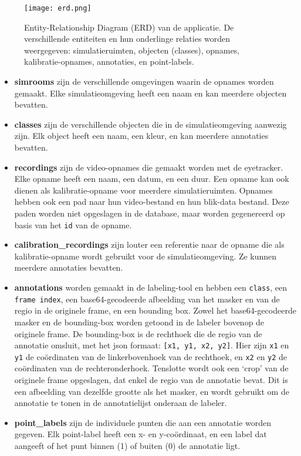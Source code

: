 \begin{figure}[H]
  \centering
  \texttt{[image: erd.png]}
  \caption[]{\label{fig:erd} Entity-Relationship Diagram (ERD) van de applicatie. De verschillende entiteiten en hun onderlinge relaties worden weergegeven: simulatieruimten, objecten (classes), opnames, kalibratie-opnames, annotaties, en point-labels. }
\end{figure}

\begin{itemize}
  \item \textbf{simrooms} zijn de verschillende omgevingen waarin de opnames worden gemaakt. 
  Elke simulatieomgeving heeft een naam en kan meerdere objecten bevatten.
  \item \textbf{classes} zijn de verschillende objecten die in de simulatieomgeving aanwezig zijn. 
  Elk object heeft een naam, een kleur, en kan meerdere annotaties bevatten.
  \item \textbf{recordings} zijn de video-opnames die gemaakt worden met de eyetracker. 
  Elke opname heeft een naam, een datum, en een duur. 
  Een opname kan ook dienen als kalibratie-opname voor meerdere simulatieruimten. 
  Opnames hebben ook een pad naar hun video-bestand en hun blik-data bestand. 
  Deze paden worden niet opgeslagen in de database, maar worden gegenereerd op basis van het \texttt{id} van de opname. 
  \item \textbf{calibration\_recordings} zijn louter een referentie naar de opname die als kalibratie-opname wordt gebruikt 
  voor de simulatieomgeving. Ze kunnen meerdere annotaties bevatten.
  \item \textbf{annotations} worden gemaakt in de labeling-tool en hebben een \texttt{class}, een \texttt{frame index}, 
  een base64-gecodeerde afbeelding van het masker en van de regio in de originele frame, en een bounding box. Zowel het base64-gecodeerde 
  masker en de bounding-box worden getoond in de labeler bovenop de originele frame. De bounding-box is de rechthoek die de regio van de 
  annotatie omsluit, met het json formaat: \texttt{[x1, y1, x2, y2]}. Hier zijn \texttt{x1} en \texttt{y1} de coördinaten van de 
  linkerbovenhoek van de rechthoek, en \texttt{x2} en \texttt{y2} de coördinaten van de rechteronderhoek. 
  Tenslotte wordt ook een `crop' van de originele frame opgeslagen, dat enkel de regio van de annotatie bevat. 
  Dit is een afbeelding van dezelfde grootte als het masker, en wordt gebruikt om de annotatie te tonen in de annotatielijst onderaan de labeler.
  \item \textbf{point\_labels} zijn de individuele punten die aan een annotatie worden gegeven. Elk point-label heeft een x- en y-coördinaat, en een label dat aangeeft of het punt binnen (1) of buiten (0) de annotatie ligt.
\end{itemize}

